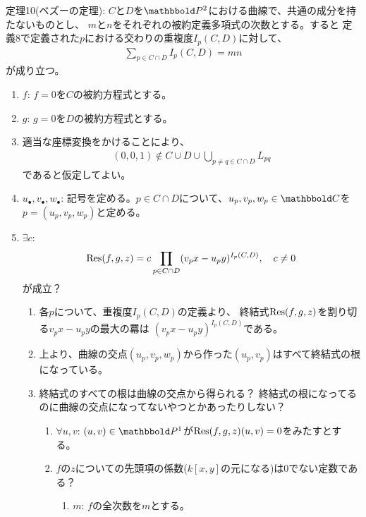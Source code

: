 \begin{framed}
  定理10(ベズーの定理):
  $C$と$D$を$\P^2$における曲線で、共通の成分を持たないものとし、
  $m$と$n$をそれぞれの被約定義多項式の次数とする。すると
  定義8で定義された$p$における交わりの重複度$I_p(C,D)$に対して、
  \begin{align}
    \sum_{p\in C\cap D}I_p(C,D) = mn
  \end{align}
  が成り立つ。
\end{framed}
\begin{myproof}
  \begin{enumerate}
    \item  $f$:
    $f=0$を$C$の被約方程式とする。
    \item $g$: $g=0$を$D$の被約方程式とする。
    \item 適当な座標変換をかけることにより、
    \begin{align}
      (0,0,1)\notin
      C\cup D \cup \bigcup_{p\neq q \in C\cap D} L_{pq}
    \end{align}
    であると仮定してよい。
    \item $u_\bullet,v_\bullet,w_\bullet$: 記号を定める。$p\in C\cap D$について、$u_p,v_p,w_p \in \C$を
    $p=(u_p,v_p,w_p)$と定める。
    \item $\exists c$:
    \begin{align}
      \mathrm{Res}(f,g,z) =
      c \prod_{p\in C\cap D} (v_p x - u_p y)^{I_p(C,D)},\quad c\neq 0
    \end{align}
    が成立？
    \begin{enumerate}
      \item
      各$p$について、重複度$I_p(C,D)$の定義より、
      終結式$\mathrm{Res}(f,g,z)$を割り切る$v_p x - u_p y$の最大の羃は
      $(v_p x - u_p y)^{I_p(C,D)}$である。
      \item
      上より、曲線の交点$(u_p,v_p,w_p)$から作った$(u_p,v_p)$はすべて終結式の根になっている。
      \item
      終結式のすべての根は曲線の交点から得られる？
      終結式の根になってるのに曲線の交点になってないやつとかあったりしない？
      \begin{enumerate}
        \item $\forall u,v$: $(u,v) \in \P^1$が$\mathrm{Res}(f,g,z)(u,v) = 0$をみたすとする。
        \item
        $f$の$z$についての先頭項の係数($k[x,y]$の元になる)は0でない定数である？
        \begin{enumerate}
          \item $m$: $f$の全次数を$m$とする。

\end{enumerate}
\end{enumerate}
\end{enumerate}
\end{enumerate}
\end{myproof}
